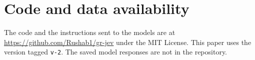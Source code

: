 \section{Code and data availability}
\label{app:availability}
The code and the instructions sent to the models are at \url{https://github.com/Rushab1/gr-jev} under the MIT License. This paper uses the version tagged \texttt{v-2}. The saved model responses are not in the repository.
